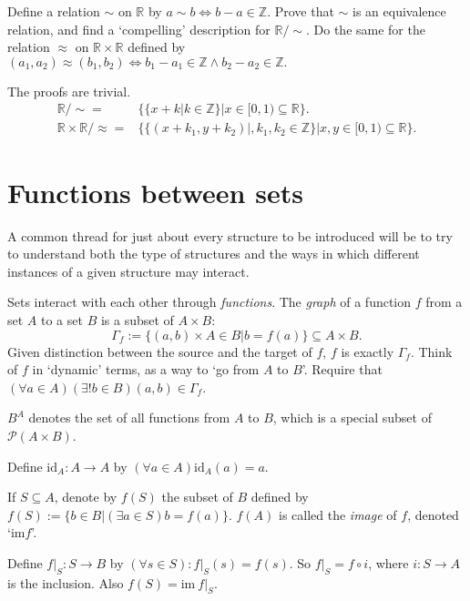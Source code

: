 \begin{exercise}
  Define a relation $\sim$ on $\mathbb{R}$ by $a\sim b \Leftrightarrow b-a\in\mathbb{Z}$. Prove that $\sim$ is an equivalence relation, and find a `compelling' description for $\mathbb{R}/\sim$. Do the same for the relation $\approx$ on $\mathbb{R}\times\mathbb{R}$ defined by $(a_1, a_2)\approx(b_1, b_2)\Leftrightarrow b_1-a_1\in\mathbb{Z}\wedge b_2-a_2\in\mathbb{Z}.$
\end{exercise}

The proofs are trivial.
\begin{align*}
  \mathbb{R}/\sim=                     & \{\{x+k|k\in \mathbb{Z}\}|x\in[0,1)\subseteq\mathbb{R}\}.                      \\
  \mathbb{R}\times \mathbb{R}/\approx= & \{\{(x+k_1,y+k_2)|, k_1,k_2\in \mathbb{Z}\}|x,y\in[0,1)\subseteq \mathbb{R}\}.
\end{align*}

\section{Functions between sets}

A common thread for just about every structure to be introduced will be to try to understand both the type of structures and the ways in which diﬀerent instances of a given structure may interact.

Sets interact with each other through \textit{functions}. The \textit{graph} of a function $f$ from a set $A$ to a set $B$ is a subset of $A\times B$:
\[
  \Gamma_f:=\{(a,b)\times A\in B|b=f(a)\}\subseteq A\times B.
\]
Given distinction between the source and the target of $f$, $f$ is exactly $\Gamma_f$. Think of $f$ in `dynamic' terms, as a way to `go from $A$ to $B$'. Require that $(\forall a\in A)(\exists !b\in B)(a,b)\in \Gamma_f$.

$B^A$ denotes the set of all functions from $A$ to $B$, which is a special subset of $\mathcal{P}(A\times B)$.

Define $\mathrm{id}_A:A\rightarrow A$ by $(\forall a\in A)\mathrm{id}_A(a)=a$.

If $S\subseteq A$, denote by $f(S)$ the subset of $B$ defined by $f(S):=\{b\in B|(\exists a\in S)b=f(a)\}$. $f(A)$ is called the \textit{image} of $f$, denoted `$\mathrm{im}f$'.

Define $f|_{S}:S\rightarrow B$ by $(\forall s\in S):f|_{S}(s)=f(s)$. So $f|_S=f\circ i$, where $i:S\rightarrow A$ is the inclusion. Also $f(S)=\mathrm{im}\ f|_S$.

